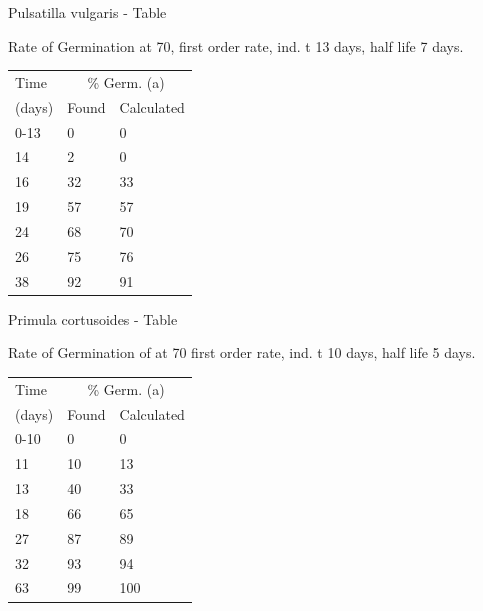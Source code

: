 \begin{table}[h!]
\begin{center}
Pulsatilla vulgaris - Table \thetable

Rate of Germination at 70, first order rate,
ind. t 13 days, half life 7 days.
\end{center}

\begin{tabular}{lll}
\hline
Time      & \multicolumn{2}{c}{\% Germ. (a)} \\
(days)    & Found & Calculated \\
\hline
0-13 & 0 & 0 \\
14 & 2 & 0 \\
16 & 32 & 33 \\
19 & 57 & 57 \\
24 & 68 & 70 \\
26 & 75 & 76 \\
38 & 92 & 91 \\
\hline
\end{tabular}
\end{table}

\begin{table}[h!]
\begin{center}
Primula cortusoides - Table \thetable

Rate of Germination of at 70 first order
rate, ind. t 10 days, half life 5 days.
\end{center}

\begin{tabular}{lll}
\hline
Time      & \multicolumn{2}{c}{\% Germ. (a)} \\
(days)    & Found & Calculated \\
\hline
0-10 & 0 & 0 \\
11 & 10 & 13 \\
13 & 40 & 33 \\
18 & 66 & 65 \\
27 & 87 & 89 \\
32 & 93 & 94 \\
63 & 99 & 100 \\
\hline
\end{tabular}
\end{table}

